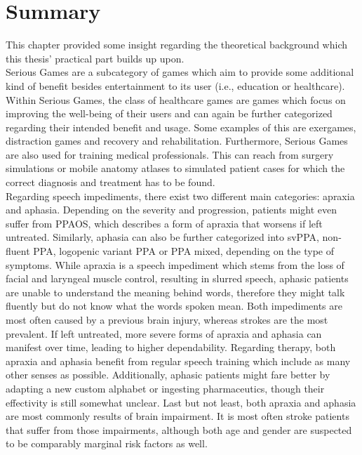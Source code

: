 \documentclass[draft,final]{vutinfth} %
\begin{document}
\section{Summary} This chapter provided some insight regarding the theoretical background which this thesis' practical part builds up upon. \\
Serious Games are a subcategory of games which aim to provide some additional kind of benefit besides entertainment to its user (i.e., education or healthcare). Within Serious Games, the class of healthcare games are games which focus on improving the well-being of their users and can again be further categorized regarding their intended benefit and usage. Some examples of this are exergames, distraction games and recovery and rehabilitation. Furthermore, Serious Games are also used for training medical professionals. This can reach from surgery simulations or mobile anatomy atlases to simulated patient cases for which the correct diagnosis and treatment has to be found.
\\
Regarding speech impediments, there exist two different main categories: apraxia and aphasia. Depending on the severity and progression, patients might even suffer from PPAOS, which describes a form of apraxia that worsens if left untreated. Similarly, aphasia can also be further categorized into svPPA, non-fluent PPA, logopenic variant PPA or PPA mixed, depending on the type of symptoms. While apraxia is a speech impediment which stems from the loss of facial and laryngeal muscle control, resulting in slurred speech, aphasic patients are unable to understand the meaning behind words, therefore they might talk fluently but do not know what the words spoken mean. Both impediments are most often caused by a previous brain injury, whereas strokes are the most prevalent.  If left untreated, more severe forms of apraxia and aphasia can manifest over time, leading to higher dependability. Regarding therapy, both apraxia and aphasia benefit from regular speech training which include as many other senses as possible. Additionally, aphasic patients might fare better by adapting a new custom alphabet or ingesting pharmaceutics, though their effectivity is still somewhat unclear. Last but not least, both apraxia and aphasia are most commonly results of brain impairment. It is most often stroke patients that suffer from those impairments, although both age and gender are suspected to be comparably marginal risk factors as well.
\\
\end{document}
